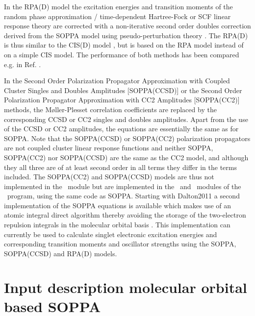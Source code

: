 In the RPA(D) model \cite{spas025} the excitation
energies and transition moments of the random phase approximation /
time-dependent Hartree-Fock or SCF linear response theory are corrected
with a non-iterative second order doubles correction derived from the
SOPPA model using pseudo-perturbation theory
\cite{Christiansen:PERTURBATIVE_TRIPLES}. The RPA(D) is thus similar to
the CIS(D) model \cite{Head-Gordon:94},
 but is based on the RPA model instead of on a simple CIS
model. The performance of both methods has been compared e.g. in Ref.
\cite{spas089}.

In the Second Order Polarization Propagator Approximation with Coupled
Cluster Singles and Doubles Amplitudes [SOPPA(CCSD)] \cite{soppaccsd,
ekdspasjpca102, tejospastcan100, ctocd, spas089}  or
the Second Order Polarization Propagator Approximation with CC2
Amplitudes [SOPPA(CC2)] \cite{spas097} methods, the
M{\o}ller-Plesset correlation coefficients are replaced by the
corresponding CCSD or CC2 singles and doubles amplitudes. Apart from
the use of the CCSD or CC2 amplitudes, the equations are essentially
the same as for SOPPA. Note that the SOPPA(CCSD) or SOPPA(CC2)
polarization propagators are not coupled cluster linear response
functions and neither SOPPA, SOPPA(CC2) nor SOPPA(CCSD) are the same as
the CC2 model, and although they all three are of at least second order
in all terms they differ in the terms included. The SOPPA(CC2) and
SOPPA(CCSD) models are thus not implemented in the \cc\ module but are
implemented in the \response\ and \abacus\ modules of the \dalton\ program,
using the same code as SOPPA. Starting with Dalton2011 a second
implementation of the SOPPA equations is available which makes use of
an atomic integral direct algorithm thereby avoiding the storage of the
two-electron repulsion integrals in the molecular orbital basis
\cite{spas025, spas037, spas089}. This implementation can currently be
used to calculate singlet electronic excitation energies and
corresponding transition moments and oscillator strengths using the
SOPPA, SOPPA(CCSD) and RPA(D) models.


\section{Input description molecular orbital based SOPPA}\label{sec:soppainput}


